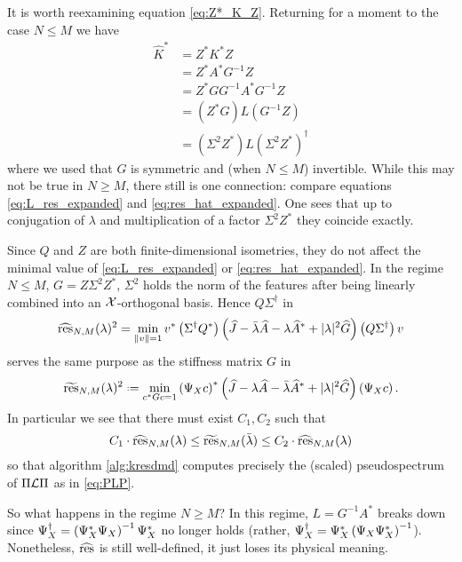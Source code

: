 It is worth reexamining equation \ref{eq:Z*_K_Z}. Returning for a moment to the case 
$N \leq M$ we have 
\begin{equation}
    \begin{split}
        \widehat{ K }^* &= Z^* K^* Z \\
        &= Z^* A^* G^{-1} Z \\
        &= Z^* G G^{-1} A^* G^{-1} Z \\
        &= \left( Z^* G \right) L \left( G^{-1} Z \right) \\
        &= \left( \Sigma^2 Z^* \right) L \left( \Sigma^2 Z^* \right)^\dagger
    \end{split}
\end{equation}
where we used that $G$ is symmetric and (when $N \leq M$) invertible. While this may not 
be true in $N \geq M$, there still is one connection: compare equations 
\ref{eq:L_res_expanded} and \ref{eq:res_hat_expanded}. One sees that up to conjugation of 
$\lambda$ and multiplication of a factor $\Sigma^2 Z^*$ they coincide exactly. 

Since $Q$ and $Z$ are both finite-dimensional isometries, they do not affect the minimal 
value of \ref{eq:L_res_expanded} or \ref{eq:res_hat_expanded}. In the regime $N \leq M$, 
$G = Z \Sigma^2 Z^*$, $\Sigma^2$ holds the norm of the features after being linearly 
combined into an $\mathcal{X}$-orthogonal basis. Hence $Q \Sigma^\dagger$ in 
\begin{equation}
    \widehat{ \text{res} }_{N,M} (\lambda)^2 = 
    \min_{\| v \| = 1}
    v^* \left( \Sigma^\dagger Q^* \right) 
    \left( 
        \widehat{ J }
        - \bar{\lambda} \widehat{ A } 
        - \lambda \widehat{ A }^* 
        + | \lambda |^2 \widehat{ G }
    \right)
    \left( Q \Sigma^\dagger \right) v
\end{equation}
serves the same purpose as the stiffness matrix $G$ in 
\begin{equation}
    \widetilde{ \res }_{N,M} (\lambda)^2 \defeq 
    \min_{c^* G c = 1}
    \left( \YX c \right)^*
    \left( 
        \widehat{ J }
        - \lambda \widehat{ A } 
        - \bar{\lambda} \widehat{ A }^* 
        + | \lambda |^2 \widehat{ G }
    \right)
    \left( \YX c \right) . 
\end{equation}
In particular we see that there must exist $C_1, C_2$ such that 
\begin{equation}
    C_1 \cdot \widehat{ \text{res} }_{N,M} (\lambda) \leq 
    \widetilde{ \text{res} }_{N,M} (\bar{\lambda}) \leq
    C_2 \cdot \widehat{ \text{res} }_{N,M} (\lambda)
\end{equation}
so that algorithm \ref{alg:kresdmd} computes precisely the (scaled) pseudospectrum of 
$\Pi \mathcal{L} \Pi$ as in \ref{eq:PLP}. 

So what happens in the regime $N \geq M$? In this regime, $L = G^{-1} A^*$ 
breaks down since $\Psi_X^\dagger = \left( \Psi_X^* \Psi_X \right)^{-1} \Psi_X^*$ no longer holds 
(rather, $\Psi_X^\dagger = \Psi_X^* \left( \Psi_X \Psi_X^* \right)^{-1}$). Nonetheless, 
$\widehat{ \text{res} }$ is still well-defined, it just loses its physical meaning. 


